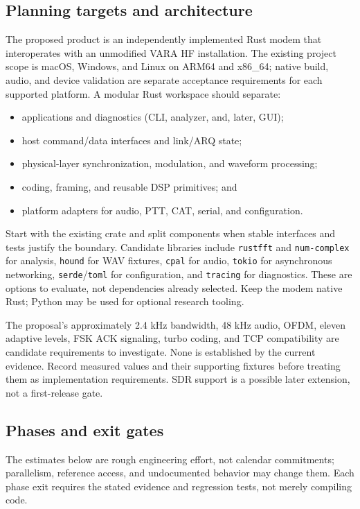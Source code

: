 \documentclass[11pt,a4paper]{article}
\begin{document}
\subsection{Planning targets and architecture}
The proposed product is an independently implemented Rust modem that
interoperates with an unmodified VARA HF installation. The existing project
scope is macOS, Windows, and Linux on ARM64 and x86\_64; native build, audio,
and device validation are separate acceptance requirements for each supported
platform. A modular Rust workspace should separate:
\begin{itemize}[leftmargin=*]
  \item applications and diagnostics (CLI, analyzer, and, later, GUI);
  \item host command/data interfaces and link/ARQ state;
  \item physical-layer synchronization, modulation, and waveform processing;
  \item coding, framing, and reusable DSP primitives; and
  \item platform adapters for audio, PTT, CAT, serial, and configuration.
\end{itemize}
Start with the existing crate and split components when stable interfaces and
tests justify the boundary. Candidate libraries include \texttt{rustfft} and
\texttt{num-complex} for analysis, \texttt{hound} for WAV fixtures,
\texttt{cpal} for audio, \texttt{tokio} for asynchronous networking,
\texttt{serde}/\texttt{toml} for configuration, and \texttt{tracing} for
diagnostics. These are options to evaluate, not dependencies already selected.
Keep the modem native Rust; Python may be used for optional research tooling.

The proposal's approximately 2.4 kHz bandwidth, 48 kHz audio, OFDM, eleven
adaptive levels, FSK ACK signaling, turbo coding, and TCP compatibility are
candidate requirements to investigate. None is established by the current
evidence. Record measured values and their supporting fixtures before treating
them as implementation requirements. SDR support is a possible later
extension, not a first-release gate.

\subsection{Phases and exit gates}
The estimates below are rough engineering effort, not calendar commitments;
parallelism, reference access, and undocumented behavior may change them.
Each phase exit requires the stated evidence and regression tests, not merely
compiling code.
\end{document}
